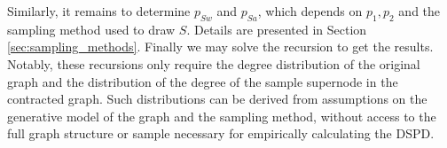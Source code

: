 Similarly, it remains to determine $p_{Sw}$ and $p_{Sa}$, which depends on $p_1, p_2$ and the sampling method used to draw $S$. Details are presented in Section \ref{sec:sampling_methods}. Finally we may solve the recursion to get the results.\\

Notably, these recursions only require the degree distribution of the original graph and the distribution of the degree of the sample supernode in the contracted graph. Such distributions can be derived from assumptions on the generative model of the graph and the sampling method, without access to the full graph structure or sample necessary for empirically calculating the DSPD.

